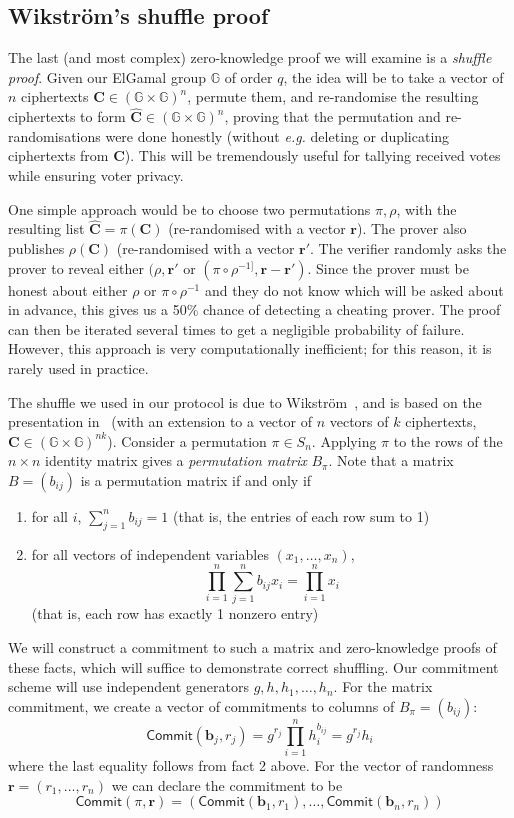 \documentclass[12pt,a4paper]{article}
\newcommand{\commit}{\mathsf{Commit}}
\theoremstyle{definition}
\newcommand{\eg}{\textit{e.g. }}
\begin{document}
\subsection{Wikström's shuffle proof}\label{sec-shuffle}
The last (and most complex) zero-knowledge proof we will examine is a \textit{shuffle proof}. Given our ElGamal group $\mathbb{G}$ of order $q$, the idea will be to take a vector of $n$ ciphertexts $\mathbf{C} \in (\mathbb{G}\times\mathbb{G})^{n}$, permute them, and re-randomise the resulting ciphertexts to form $\mathbf{\hat{C}}\in(\mathbb{G}\times\mathbb{G})^{n}$, proving that the permutation and re-randomisations were done honestly (without \eg deleting or duplicating ciphertexts from $\mathbf{C}$). This will be tremendously useful for tallying received votes while ensuring voter privacy.

One simple approach would be to choose two permutations $\pi,\rho$, with the resulting list $\mathbf{\hat{C}}=\pi(\mathbf{C})$ (re-randomised with a vector $\mathbf{r}$). The prover also publishes $\rho(\mathbf{C})$ (re-randomised with a vector $\mathbf{r'}$. The verifier randomly asks the prover to reveal either $(\rho, \mathbf{r'}$ or $(\pi\circ\rho^{-1]}, \mathbf{r}-\mathbf{r'})$. Since the prover must be honest about either $\rho$ or $\pi\circ\rho^{-1}$ and they do not know which will be asked about in advance, this gives us a 50\% chance of detecting a cheating prover. The proof can then be iterated several times to get a negligible probability of failure. However, this approach is very computationally inefficient; for this reason, it is rarely used in practice.

The shuffle we used in our protocol is due to Wikström~\cite{wikstrom2011implement}, and is based on the presentation in~\cite{haenni2017pseudo} (with an extension to a vector of $n$ vectors of $k$ ciphertexts, $\mathbf{C}\in(\mathbb{G}\times\mathbb{G})^{nk}$). Consider a permutation $\pi\in S_n$. Applying $\pi$ to the rows of the $n\times n$ identity matrix gives a \textit{permutation matrix} $B_\pi$. Note that a matrix $B=(b_{ij})$ is a permutation matrix if and only if
\begin{enumerate}
    \item for all $i$, $\sum_{j=1}^n b_{ij} = 1$ (that is, the entries of each row sum to 1)
    \item for all vectors of independent variables $(x_1,\ldots,x_n)$,
    $$\prod_{i=1}^n\sum_{j=1}^nb_{ij} x_i=\prod_{i=1}^n x_i$$
    (that is, each row has exactly 1 nonzero entry)
\end{enumerate}
We will construct a commitment to such a matrix and zero-knowledge proofs of these facts, which will suffice to demonstrate correct shuffling. Our commitment scheme will use independent generators $g, h, h_1, \ldots, h_n$. For the matrix commitment, we create a vector of commitments to columns of $B_\pi=(b_{ij})$:
$$\commit(\mathbf{b}_j, r_j) = g^{r_j}\prod_{i=1}^n h_i^{b_{ij}} = g^{r_j}h_i$$
where the last equality follows from fact 2 above. For the vector of randomness $\mathbf{r}=(r_1,\ldots, r_n)$ we can declare the commitment to be
$$\commit(\pi, \mathbf{r}) = (\commit(\mathbf{b}_1, r_1),\ldots,\commit(\mathbf{b}_n, r_n))$$
\end{document}
